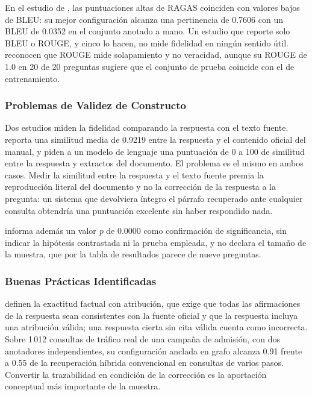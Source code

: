 \documentclass[man,12pt,floatsintext,donotrepeattitle]{apa7}
\begin{document}
En el estudio de \textcite{khasanova2025}, las puntuaciones altas de RAGAS coinciden con valores bajos de BLEU: su mejor configuración alcanza una pertinencia de 0.7606 con un BLEU de 0.0352 en el conjunto anotado a mano. Un estudio que reporte solo BLEU o ROUGE, y cinco lo hacen, no mide fidelidad en ningún sentido útil. \textcite{rachmat2024} reconocen que ROUGE mide solapamiento y no veracidad, aunque su ROUGE de 1.0 en 20 de 20 preguntas sugiere que el conjunto de prueba coincide con el de entrenamiento.

\subsubsection{Problemas de Validez de Constructo}
Dos estudios miden la fidelidad comparando la respuesta con el texto fuente. \textcite{comia2025} reporta una similitud media de 0.9219 entre la respuesta y el contenido oficial del manual, y \textcite{joldea2025} piden a un modelo de lenguaje una puntuación de 0 a 100 de similitud entre la respuesta y extractos del documento. El problema es el mismo en ambos casos. Medir la similitud entre la respuesta y el texto fuente premia la reproducción literal del documento y no la corrección de la respuesta a la pregunta: un sistema que devolviera íntegro el párrafo recuperado ante cualquier consulta obtendría una puntuación excelente sin haber respondido nada.

\textcite{comia2025} informa además un valor \emph{p} de 0.0000 como confirmación de significancia, sin indicar la hipótesis contrastada ni la prueba empleada, y no declara el tamaño de la muestra, que por la tabla de resultados parece de nueve preguntas.

\subsubsection{Buenas Prácticas Identificadas}
\textcite{stepanov2026} definen la exactitud factual con atribución, que exige que todas las afirmaciones de la respuesta sean consistentes con la fuente oficial y que la respuesta incluya una atribución válida; una respuesta cierta sin cita válida cuenta como incorrecta. Sobre 1\,012 consultas de tráfico real de una campaña de admisión, con dos anotadores independientes, su configuración anclada en grafo alcanza 0.91 frente a 0.55 de la recuperación híbrida convencional en consultas de varios pasos. Convertir la trazabilidad en condición de la corrección es la aportación conceptual más importante de la muestra.
\end{document}
